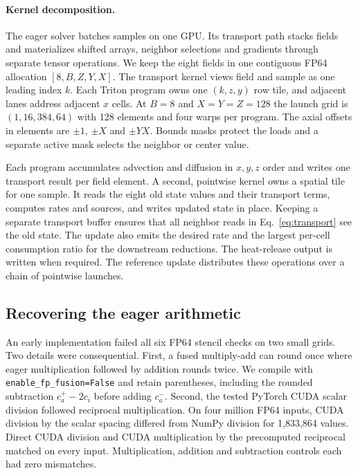 \documentclass{article}
\newcommand{\code}[1]{\texttt{#1}}
\begin{document}
\paragraph{Kernel decomposition.}
The eager solver batches samples on one GPU. Its transport path stacks fields and materializes shifted arrays, neighbor selections and gradients through separate tensor operations. We keep the eight fields in one contiguous FP64 allocation $[8,B,Z,Y,X]$. The transport kernel views field and sample as one leading index $k$. Each Triton program owns one $(k,z,y)$ row tile, and adjacent lanes address adjacent $x$ cells. At $B=8$ and $X=Y=Z=128$ the launch grid is $(1,16{,}384,64)$ with 128 elements and four warps per program. The axial offsets in elements are $\pm1$, $\pm X$ and $\pm YX$. Bounds masks protect the loads and a separate active mask selects the neighbor or center value.

Each program accumulates advection and diffusion in $x,y,z$ order and writes one transport result per field element. A second, pointwise kernel owns a spatial tile for one sample. It reads the eight old state values and their transport terms, computes rates and sources, and writes updated state in place. Keeping a separate transport buffer ensures that all neighbor reads in Eq.~\eqref{eq:transport} see the old state. The update also emits the desired rate and the largest per-cell consumption ratio for the downstream reductions. The heat-release output is written when required. The reference update distributes these operations over a chain of pointwise launches.

\subsection{Recovering the eager arithmetic}\label{sec:arithmetic}
An early implementation failed all six FP64 stencil checks on two small grids. Two details were consequential. First, a fused multiply-add can round once where eager multiplication followed by addition rounds twice. We compile with \code{enable\_fp\_fusion=False} and retain parentheses, including the rounded subtraction $c_a^+-2c_i$ before adding $c_a^-$. Second, the tested PyTorch CUDA scalar division followed reciprocal multiplication. On four million FP64 inputs, CUDA division by the scalar spacing differed from NumPy division for 1,833,864 values. Direct CUDA division and CUDA multiplication by the precomputed reciprocal matched on every input. Multiplication, addition and subtraction controls each had zero mismatches.
\end{document}
